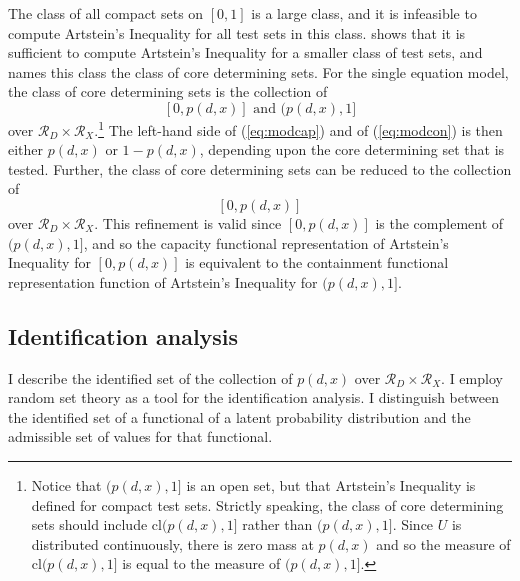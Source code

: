 \documentclass[10pt,a4paper,twoside]{article}
\numberwithin{equation}{section}
\newcommand{\Art}{Artstein's Inequality}
\begin{document}
The class of all compact sets on $[0,1]$ is a large class, and it is infeasible to compute {\Art} for all test sets in this class. \cite{crs13} shows that it is sufficient to compute {\Art} for a smaller class of test sets, and names this class the class of core determining sets. For the single equation model, the class of core determining sets is the collection of 
\[[0,p(d,x)]\text{ and }(p(d,x),1]\]
over $\mathcal{R}_D\times\mathcal{R}_X$.\footnote{Notice that $(p(d,x),1]$ is an open set, but that {\Art} is defined for compact test sets. Strictly speaking, the class of core determining sets should include $\text{cl}(p(d,x),1]$ rather than $(p(d,x),1]$. Since $U$ is distributed continuously, there is zero mass at $p(d,x)$ and so the measure of $\text{cl}(p(d,x),1]$ is equal to the measure of $(p(d,x),1]$.} The left-hand side of (\ref{eq:modcap}) and of (\ref{eq:modcon}) is then either $p(d,x)$ or $1-p(d,x)$, depending upon the core determining set that is tested. Further, the class of core determining sets can be reduced to the collection of
\[[0,p(d,x)]\]
over $\mathcal{R}_D\times\mathcal{R}_X$. This refinement is valid since $[0,p(d,x)]$ is the complement of $(p(d,x),1]$, and so the capacity functional representation of {\Art} for $[0,p(d,x)]$ is equivalent to the containment functional representation function of {\Art} for $(p(d,x),1]$.
\subsection{Identification analysis}
I describe the identified set of the collection of $p(d,x)$ over $\mathcal{R}_D\times\mathcal{R}_X$. I employ random set theory as a tool for the identification analysis. I distinguish between the identified set of a functional of a latent probability distribution and the admissible set of values for that functional.
\end{document}
